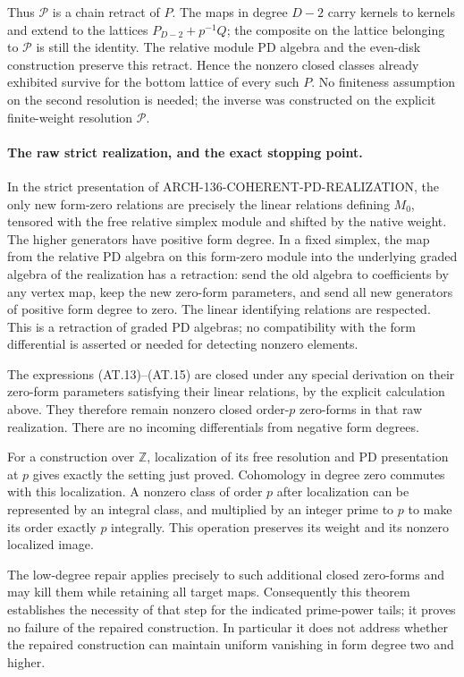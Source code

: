 Thus \(\mathcal P\) is a chain retract of \(P\).
The maps in degree \(D-2\) carry kernels to kernels and
extend to the lattices \(P_{D-2}+p^{-1}Q\); the composite
on the lattice belonging to \(\mathcal P\) is still the
identity. The relative module PD algebra and the even-disk
construction preserve this retract. Hence the nonzero closed
classes already exhibited survive for the bottom lattice
of every such \(P\). No finiteness assumption on the second
resolution is needed; the inverse was constructed on the
explicit finite-weight resolution \(\mathcal P\).

\paragraph{The raw strict realization, and the exact stopping point.}
In the strict presentation of
ARCH-136-COHERENT-PD-REALIZATION, the only new form-zero
relations are precisely the linear relations defining
\(M_0\), tensored with the free relative simplex module
and shifted by the native weight. The higher generators have
positive form degree. In a fixed simplex, the map from the
relative PD algebra on this form-zero module into the
underlying graded algebra of the realization has a retraction:
send the old algebra to coefficients by any vertex map, keep
the new zero-form parameters, and send all new generators of
positive form degree to zero. The linear identifying relations
are respected. This is a retraction of graded PD algebras;
no compatibility with the form differential is asserted or
needed for detecting nonzero elements.

The expressions (AT.13)--(AT.15) are closed under any special
derivation on their zero-form parameters satisfying their
linear relations, by the explicit calculation above. They
therefore remain nonzero closed order-\(p\) zero-forms in
that raw realization. There are no incoming differentials
from negative form degrees.

For a construction over \(\mathbb Z\), localization of its
free resolution and PD presentation at \(p\) gives exactly
the setting just proved. Cohomology in degree zero commutes
with this localization. A nonzero class of order \(p\) after
localization can be represented by an integral class, and
multiplied by an integer prime to \(p\) to make its order
exactly \(p\) integrally. This operation preserves its weight
and its nonzero localized image.

The low-degree repair applies precisely to such additional
closed zero-forms and may kill them while retaining all target
maps. Consequently this theorem establishes the necessity of
that step for the indicated prime-power tails; it proves no
failure of the repaired construction. In particular it does
not address whether the repaired construction can maintain
uniform vanishing in form degree two and higher.

